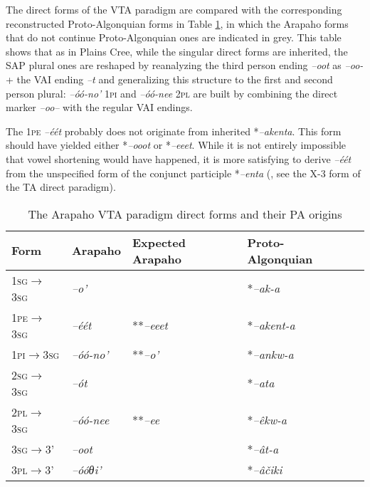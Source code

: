 \documentclass[twoside,a4paper,11pt]{article}
\newcommand{\ipa}[1]{{\phon\textit{#1}}}
\newcommand{\sg}{\textsc{sg}}
\newcommand{\pl}{\textsc{pl}}
\newcommand{\grise}[1]{\cellcolor{lightgray}\textbf{#1}}
\newcommand{\Σ}{\greek{Σ}}
\newcommand{\pli}{\textsc{pi}}
\newcommand{\pe}{\textsc{pe}}
\begin{document}
The direct forms of the VTA paradigm are compared with the corresponding reconstructed Proto-Algonquian forms in Table \ref{tab:arapaho.vta.1}, in which the Arapaho forms that do not continue Proto-Algonquian ones are indicated in grey. This table shows that as in Plains Cree, while the singular direct forms are inherited, the SAP plural ones are reshaped by reanalyzing the third person ending \ipa{--oot} as \ipa{--oo-} + the VAI ending \ipa{--t} and generalizing this structure to the first and second person plural: \ipa{--óó-no'} 1\pli{} and \ipa{--óó-nee} 2\pl{} are built by combining the direct marker \ipa{--oo--} with the regular VAI endings.

The 1\pe{} \ipa{--éét} probably does not originate from inherited  *\ipa{--akenta}. This form should have yielded  either *\ipa{--ooot} or *\ipa{--eeet}. While it is not entirely impossible that vowel shortening would have happened, it is more satisfying to derive  \ipa{--éét}  from the unspecified form of the conjunct participle  *\ipa{--enta} (\citealt[4]{goddard98morphology.arapaho}, see the X-3 form of the TA direct paradigm).

\begin{table}[H]
\caption{The Arapaho VTA paradigm direct forms and their PA origins}
\centering \label{tab:arapaho.vta.1}
\begin{tabular}{lllll}
\toprule
Form& Arapaho & Expected Arapaho & Proto-Algonquian \\
\midrule
 1\sg{}$\rightarrow$3\sg{} & 	\ipa{--o'} & 	 & 	*\ipa{--ak-a} & 		\\		
1\pe{}$\rightarrow$3\sg{} & 	\ipa{--éét}\grise{} & 	**\ipa{--eeet}&  *\ipa{--akent-a} & 		\\		
1\pli{}$\rightarrow$3\sg{} & 	\ipa{--óó-no'}\grise{} & 	**\ipa{--o'}& *\ipa{--ankw-a} & 		\\		
\midrule
2\sg{}$\rightarrow$3\sg{} & 	\ipa{--ót} && 	*\ipa{--ata} & 		\\		
2\pl{}$\rightarrow$3\sg{} & 	\ipa{--óó-nee} \grise{}& 	**\ipa{--ee}& *\ipa{--êkw-a} & 		\\		
\midrule
3\sg{}$\rightarrow$3' & 	\ipa{--oot} & 	&*\ipa{--ât-a} & 		\\		
3\pl{}$\rightarrow$3' & 	\ipa{--óóθi'} & &	*\ipa{--âčiki} & 		\\		
\bottomrule
\end{tabular}
\end{table}
\end{document}
